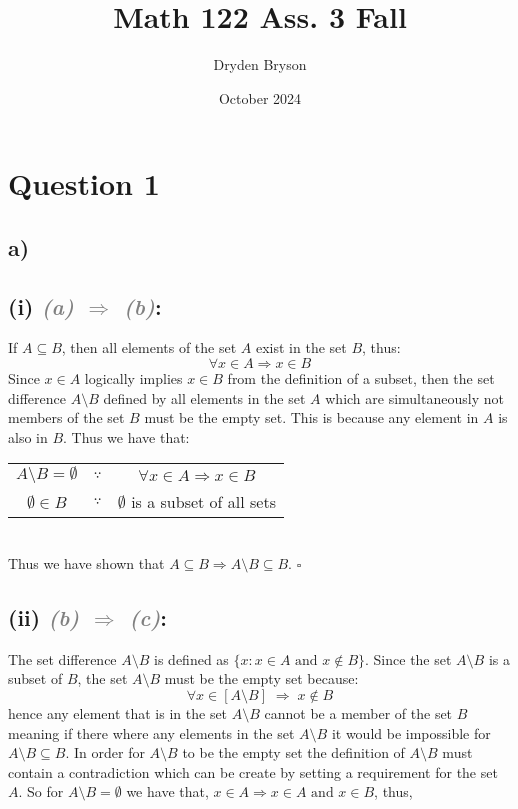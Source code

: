 \documentclass{article}
\title{Math 122 Ass. 3 Fall}
\author{Dryden Bryson}
\date{October 2024}
\begin{document}
\maketitle
\newpage
\section*{Question 1}
\subsection*{a)}
\subsection*{(i) \textcolor{gray}{\small{\textit{(a) $\Rightarrow$ (b)}}}:}
If $A\subseteq B$, then all elements of the set $A$ exist in the set $B$, thus: $$\forall x\in A \Rightarrow x\in B$$
Since $x\in A$ logically implies $x \in B$ from the definition of a subset, then the set difference $A \setminus B$ defined by all elements in the set $A$ which are simultaneously not members of the set $B$ must be the empty set. This is because any element in $A$ is also in $B$. Thus we have that: 

\begin{table}[htp]
    \centering
    \begin{tabular}{ccc}
        $A \setminus B = \emptyset$ & $\because$ & $\forall x \in A \Rightarrow x\in B$\\
        $\emptyset\in B$ & $\because$ & $\emptyset$ is a subset of all sets\\
    \end{tabular}
\end{table}
 \\
Thus we have shown that $A \subseteq B \Rightarrow A\setminus B \subseteq B$. $\square$

\subsection*{(ii) \textcolor{gray}{\small{\textit{(b) $\Rightarrow$ (c)}}}:}
The set difference $A\setminus B$ is defined as $\{x:x \in A \text{ and } x\not\in B\}$. Since the set $A\setminus B$ is a subset of $B$, the set $A\setminus B$ must be the empty set because: $$\forall x \in \left[ A
\setminus B\right]\;\Rightarrow\;x\not\in B$$ hence any element that is in the set $A\setminus B$ cannot be a member of the set $B$ meaning if there where any elements in the set $A\setminus B$ it would be impossible for $A\setminus B \subseteq B$. \newline
In order for $A\setminus B$ to be the empty set the definition of $A\setminus B$ must contain  a contradiction which can be create by setting a requirement for the set $A$. So for $A\setminus B=\emptyset$ we have that, $x\in A \Rightarrow  x\in A \text{ and } x\in B$, thus, 
\end{document}
